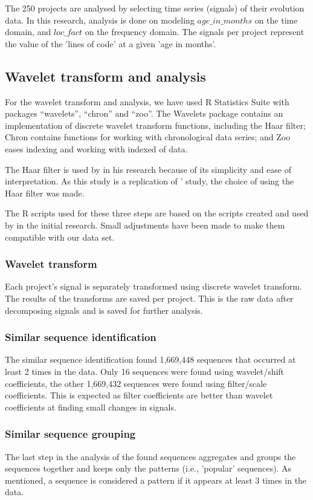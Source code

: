 The 250 projects are analysed by selecting time series (signals) of their
evolution data. In this research, analysis is done on modeling $age\_in\_months$
on the time domain, and $loc\_fact$ on the frequency domain. The signals per
project represent the value of the 'lines of code' at a given 'age in months'.

\subsection{Wavelet transform and analysis}

For the wavelet transform and analysis, we have used R Statistics Suite
with packages ``wavelets'', ``chron'' and ``zoo''. The Wavelets package
contains an implementation of discrete wavelet transform functions, including
the Haar filter; Chron contains functions for working with chronological data
series; and Zoo eases indexing and working with indexed of data.

The Haar filter is used by \citet{karus2013} in his research because of its
simplicity and ease of interpretation. As this study is a replication of
\citeauthor{karus2013}' study, the choice of using the Haar filter was made.

The R scripts used for these three steps are based on the scripts created and
used by \citeauthor{karus2013} in the initial research. Small adjustments have
been made to make them compatible with our data set.

\subsubsection{Wavelet transform}
Each project's signal is separately transformed using discrete wavelet
transform. The results of the transforms are saved per project. This is the raw
data after decomposing signals and is saved for further analysis.

\subsubsection{Similar sequence identification}
The similar sequence identification found 1,669,448 sequences that occurred
at least 2 times in the data. Only 16 sequences were found using wavelet/shift
coefficients, the other 1,669,432 sequences were found using filter/scale
coefficients. This is expected as filter coefficients are better than wavelet
coefficients at finding small changes in signals.

\subsubsection{Similar sequence grouping}
The last step in the analysis of the found sequences aggregates and groups the
sequences together and keeps only the patterns (i.e., 'popular' sequences). As
mentioned, a sequence is considered a pattern if it appears at least 3 times in
the data.

